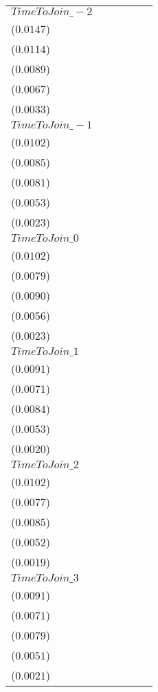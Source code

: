 \begin{tabular}{llllll}
$TimeToJoin\_-2$  &     \makecell{$0.0030^{}$ \\ ($0.0147$)} &     \makecell{$0.0053^{}$ \\ ($0.0114$)} &   \makecell{$-0.0196^{**}$ \\ ($0.0089$)} &     \makecell{$-0.0087^{}$ \\ ($0.0067$)} &   \makecell{$0.0073^{**}$ \\ ($0.0033$)} \\
$TimeToJoin\_-1$  &     \makecell{$0.0005^{}$ \\ ($0.0102$)} &     \makecell{$0.0009^{}$ \\ ($0.0085$)} &   \makecell{$-0.0201^{**}$ \\ ($0.0081$)} &    \makecell{$-0.0089^{*}$ \\ ($0.0053$)} &   \makecell{$0.0057^{**}$ \\ ($0.0023$)} \\
$TimeToJoin\_0$   &    \makecell{$-0.0035^{}$ \\ ($0.0102$)} &    \makecell{$-0.0024^{}$ \\ ($0.0079$)} &   \makecell{$-0.0194^{**}$ \\ ($0.0090$)} &     \makecell{$-0.0083^{}$ \\ ($0.0056$)} &    \makecell{$0.0041^{*}$ \\ ($0.0023$)} \\
$TimeToJoin\_1$   &    \makecell{$-0.0062^{}$ \\ ($0.0091$)} &    \makecell{$-0.0051^{}$ \\ ($0.0071$)} &   \makecell{$-0.0202^{**}$ \\ ($0.0084$)} &    \makecell{$-0.0094^{*}$ \\ ($0.0053$)} &     \makecell{$0.0033^{}$ \\ ($0.0020$)} \\
$TimeToJoin\_2$   &    \makecell{$-0.0061^{}$ \\ ($0.0102$)} &    \makecell{$-0.0039^{}$ \\ ($0.0077$)} &   \makecell{$-0.0187^{**}$ \\ ($0.0085$)} &    \makecell{$-0.0095^{*}$ \\ ($0.0052$)} &   \makecell{$0.0043^{**}$ \\ ($0.0019$)} \\
$TimeToJoin\_3$   &    \makecell{$-0.0033^{}$ \\ ($0.0091$)} &    \makecell{$-0.0018^{}$ \\ ($0.0071$)} &  \makecell{$-0.0213^{***}$ \\ ($0.0079$)} &    \makecell{$-0.0099^{*}$ \\ ($0.0051$)} &    \makecell{$0.0036^{*}$ \\ ($0.0021$)} \\

\end{tabular}
